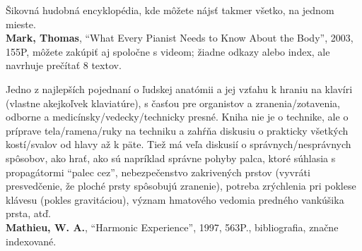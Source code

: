 \documentclass[11pt,a4paper]{book}
\begin{document}
Šikovná hudobná encyklopédia, kde môžete nájsť takmer všetko, na jednom mieste.
\medskip\\
\textbf{\hypertarget{r:mark}{Mark, Thomas}}, “What Every Pianist Needs to Know About the Body”, 2003, 155P, môžete zakúpiť aj spoločne s videom; žiadne odkazy alebo index, ale navrhuje prečítať 8 textov. 

Jedno z najlepších pojednaní o ľudskej anatómii a jej vzťahu k hraniu na klavíri (vlastne akejkoľvek klaviatúre), s časťou  pre organistov a zranenia/zotavenia, odborne a medicínsky/vedecky/technicky presné. Kniha nie je o technike, ale o príprave tela/ramena/ruky na techniku a zahŕňa diskusiu o prakticky všetkých kostí/svalov od hlavy až k päte. Tiež má veľa diskusií o správnych/nesprávnych spôsobov, ako hrať, ako sú napríklad správne pohyby palca, ktoré súhlasia s propagátormi “palec cez”, nebezpečenstvo zakrivených prstov (vyvráti presvedčenie, že ploché prsty spôsobujú zranenie), potreba zrýchlenia pri poklese klávesu (pokles gravitáciou), význam hmatového vedomia predného vankúšika prsta, atď.
\medskip\\
\textbf{Mathieu, W. A.}, “Harmonic Experience”, 1997, 563P., bibliografia, značne indexované. 
\end{document}
